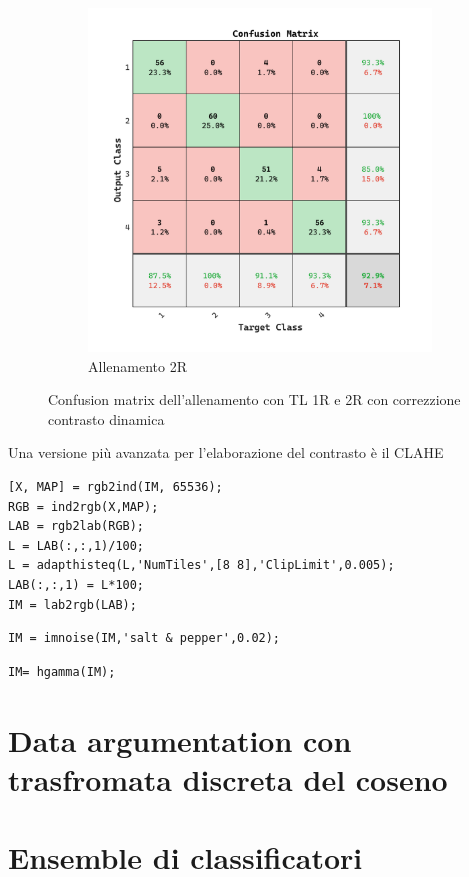 \begin{figure}[ht]
\begin{subfigure}{0.45\textwidth}
        \includegraphics[width=\textwidth]{addestramento-rete-neurale/two-contrast-bis.pdf}
        \caption{Allenamento 2R} 
    \end{subfigure}
    \caption{Confusion matrix dell'allenamento con TL 1R e 2R con correzzione contrasto dinamica}
    \label{fig:contrast-bis}
\end{figure}

Una versione più avanzata per l'elaborazione del contrasto è il CLAHE

\begin{lstlisting}
[X, MAP] = rgb2ind(IM, 65536);
RGB = ind2rgb(X,MAP);
LAB = rgb2lab(RGB);
L = LAB(:,:,1)/100;
L = adapthisteq(L,'NumTiles',[8 8],'ClipLimit',0.005);
LAB(:,:,1) = L*100;
IM = lab2rgb(LAB);
\end{lstlisting}

\begin{lstlisting}
IM = imnoise(IM,'salt & pepper',0.02);
\end{lstlisting}

\begin{lstlisting}
IM= hgamma(IM);
\end{lstlisting}

\section{Data argumentation con trasfromata discreta del coseno}\label{data-argumentation-con-trasfromata-discreta-del-coseno}

\section{Ensemble di classificatori}\label{ensemble-di-classificatori}

